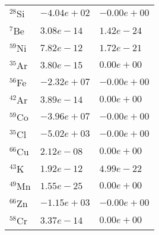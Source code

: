 \begin{tabular}{lll}
 $^{28}$Si & $-4.04e+02 $                                                       & $-0.00e+00 $                                                                    \\
 $^{7}$Be  & $3.08e-14 $                                                        & $1.42e-24 $                                                                     \\
 $^{59}$Ni & $7.82e-12 $                                                        & $1.72e-21 $                                                                     \\
 $^{35}$Ar & $3.80e-15 $                                                        & $0.00e+00 $                                                                     \\
 $^{56}$Fe & $-2.32e+07 $                                                       & $-0.00e+00 $                                                                    \\
 $^{42}$Ar & $3.89e-14 $                                                        & $0.00e+00 $                                                                     \\
 $^{59}$Co & $-3.96e+07 $                                                       & $-0.00e+00 $                                                                    \\
 $^{35}$Cl & $-5.02e+03 $                                                       & $-0.00e+00 $                                                                    \\
 $^{66}$Cu & $2.12e-08 $                                                        & $0.00e+00 $                                                                     \\
 $^{43}$K  & $1.92e-12 $                                                        & $4.99e-22 $                                                                     \\
 $^{49}$Mn & $1.55e-25 $                                                        & $0.00e+00 $                                                                     \\
 $^{66}$Zn & $-1.15e+03 $                                                       & $-0.00e+00 $                                                                    \\
 $^{58}$Cr & $3.37e-14 $                                                        & $0.00e+00 $                                                                     \\

\end{tabular}
